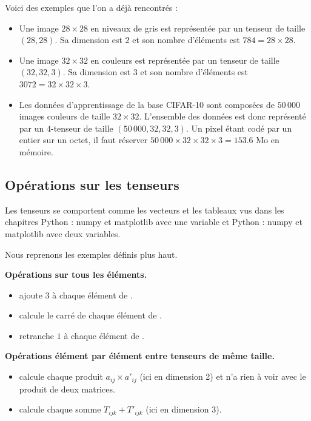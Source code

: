 \documentclass[11pt,class=report,crop=false]{standalone}
\begin{document}
\begin{itemize}
\begin{itemize}
    \end{itemize}    
\end{itemize}      
    

Voici des exemples que l'on a déjà rencontrés :
\begin{itemize}
  \item Une image $28\times28$ en niveaux de gris est représentée par un tenseur de taille $(28, 28)$. 
  Sa dimension est $2$ et son nombre d'éléments est $784 = 28 \times 28$.
\item Une image $32\times32$ en couleurs est représentée par un tenseur de taille $(32, 32,3)$. Sa dimension est $3$ et son nombre d'éléments est $3072 = 32 \times 32 \times 3$.
\item Les données d'apprentissage de la base CIFAR-10 sont composées de $50\,000$ images couleurs de taille $32\times32$. L'ensemble des données est donc représenté par un $4$-tenseur de taille $(50\,000,32,32,3)$. Un pixel étant codé par un entier sur un octet, il faut réserver $50\,000 \times 32 \times 32 \times 3 = 153.6$ Mo en mémoire.
\end{itemize}


\subsection{Opérations sur les tenseurs}

Les tenseurs se comportent comme les vecteurs et les tableaux \numpy{} vus dans les chapitres \og{}Python : numpy et matplotlib avec une variable\fg{}
et \og{}Python : numpy et matplotlib avec deux variables\fg{}.

Nous reprenons les exemples définis plus haut.

\textbf{Opérations sur tous les éléments.}
\begin{itemize}
  \item {} ajoute $3$ à chaque élément de .
  \item {} calcule le carré de chaque élément de .
  \item {} retranche $1$ à chaque élément de .
\end{itemize}

\textbf{Opérations élément par élément entre tenseurs de même taille.}
\begin{itemize}
  \item {} calcule chaque produit $a_{ij}\times a'_{ij}$ (ici en dimension 2) et n'a rien à voir avec le produit de deux matrices.
  \item {} calcule chaque somme $T_{ijk}+T'_{ijk}$ (ici en dimension 3).
\end{itemize}
\end{document}
